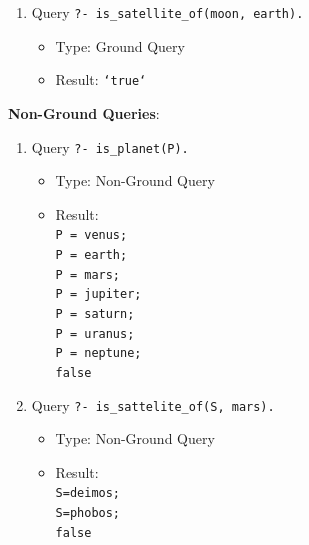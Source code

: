\documentclass[12pt]{article}
\begin{document}
\begin{spacing}{1.5}
\begin{enumerate}
\begin{enumerate}
		      	\item 
		      	      Query \texttt{?- is\_satellite\_of(moon, earth).}
		      	      \begin{itemize}
		      	      	\item Type: Ground Query
		      	      	\item Result: \texttt{`true`}\\
		      	      \end{itemize}
		      \end{enumerate}
		      		      		      		      		      		      		      
		      \textbf{Non-Ground Queries}:
		      \begin{enumerate}
		      			      			      			      			      			      			      	
		      	\item 
		      	      Query \texttt{?- is\_planet(P).}
		      	      \begin{itemize}
		      	      	\item Type: Non-Ground Query
		      	      	\item Result: \texttt{\\
		      	      		P = venus;\\
		      	      		P = earth;\\
		      	      		P = mars;\\
		      	      		P = jupiter;\\
		      	      		P = saturn;\\
		      	      		P = uranus;\\
		      	      		P = neptune;\\
		      	      	false}
		      	      \end{itemize}
		      	      		      	      		      	      		      	      		      	      		      	      		      	      
		      	\item 
		      	      Query \texttt{?- is\_sattelite\_of(S, mars).}
		      	      \begin{itemize}
		      	      	\item Type: Non-Ground Query
		      	      	\item Result: \texttt{\\
		      	      		S=deimos;\\
		      	      		S=phobos;\\
		      	      	false}
		      	      \end{itemize}
		      	      		      	      		      	      		      	      		      	      		      	      

\end{enumerate}
\end{enumerate}
\end{spacing}
\end{document}
